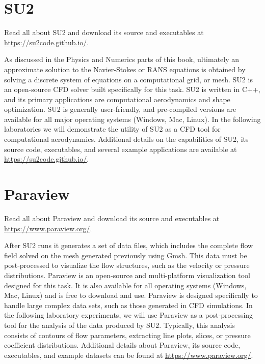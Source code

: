 \section{SU2}
\begin{su2note}
	Read all about SU2 and download its source and executables at \href{https://su2code.github.io/}{https://su2code.github.io/}.
\end{su2note}
As discussed in the Physics and Numerics parts of this book, ultimately an approximate solution to the Navier-Stokes or RANS equations is obtained by solving a discrete system of equations on a computational grid, or mesh. SU2 is an open-source CFD solver built specifically for this task. SU2 is written in C++, and its primary applications are computational aerodynamics and shape optimization. SU2 is generally user-friendly, and pre-compiled versions are available for all major operating systems (Windows, Mac, Linux). In the following laboratories we will demonstrate the utility of SU2 as a CFD tool for computational aerodynamics. Additional details on the capabilities of SU2, its source code, executables, and several example applications are available at \href{https://su2code.github.io/}{https://su2code.github.io/}.

\section{Paraview}
\begin{paraviewnote}
	Read all about Paraview and download its source and executables at \href{https://www.paraview.org/}{https://www.paraview.org/}.
\end{paraviewnote}
After SU2 runs it generates a set of data files, which includes the complete flow field solved on the mesh generated previously using Gmsh. This data must be post-processed to visualize the flow structures, such as the velocity or pressure distributions. Paraview is an open-source and multi-platform visualization tool designed for this task. It is also available for all operating systems (Windows, Mac, Linux) and is free to download and use. Paraview is designed specifically to handle large complex data sets, such as those generated in CFD simulations. In the following laboratory experiments, we will use Paraview as a post-processing tool for the analysis of the data produced by SU2. Typically, this analysis consists of contours of flow parameters, extracting line plots, slices, or pressure coefficient distributions. Additional details about Paraview, its source code, executables, and example datasets can be found at \href{https://www.paraview.org/}{https://www.paraview.org/}.

